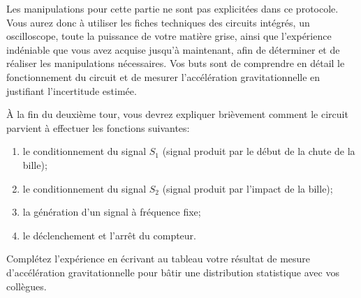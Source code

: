 Les manipulations pour cette partie ne sont pas explicitées dans ce protocole. Vous aurez donc à utiliser les fiches techniques des circuits intégrés, un oscilloscope, toute la puissance de votre matière grise, ainsi que l'expérience indéniable que vous avez acquise jusqu'à maintenant, afin de déterminer et de réaliser les manipulations nécessaires. Vos buts sont de comprendre en détail le fonctionnement du circuit et de mesurer l'accélération gravitationnelle en justifiant l'incertitude estimée.

À la fin du deuxième tour, vous devrez expliquer brièvement comment le circuit parvient à effectuer les fonctions suivantes:
\begin{enumerate}
    \item le conditionnement du signal $S_1$ (signal produit par le début de la chute de la bille);
    \item le conditionnement du signal $S_2$ (signal produit par l'impact de la bille);
    \item la génération d'un signal à fréquence fixe;
    \item le déclenchement et l'arrêt du compteur.
\end{enumerate}

Complétez l'expérience en écrivant au tableau votre résultat de mesure d'accélération gravitationnelle pour bâtir une distribution statistique avec vos collègues.